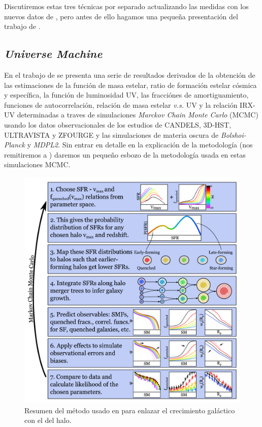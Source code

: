 Discutiremos estas tres técnicas por separado actualizando las medidas con los nuevos datos de \cite{behroozi2019universemachine}, pero antes de ello hagamos una pequeña presentación del trabajo de \cite{behroozi2019universemachine}.

\subsection{\textit{Universe Machine}}

En el trabajo de \cite{behroozi2019universemachine} se presenta una serie de resultados derivados de la obtención de las estimaciones de la función de masa estelar, ratio de formación estelar cósmica y específica, la función de luminosidad UV, las fracciónes de amortiguamiento, funciones de autocorrelación, relación de masa estelar \textit{v.s.} UV y la relación IRX-UV determinadas a traves de simulaciones \textit{Marckov Chain Monte Carlo} (MCMC) usando los datos observacionales de los estudios de CANDELS, 3D-HST, ULTRAVISTA y ZFOURGE y las simulaciones de materia oscura de \textit{Bolshoi-Planck} y \textit{MDPL2}. Sin entrar en detalle en la explicación de la metodología (nos remitiremos a \cite{behroozi2019universemachine}) daremos un pequeño esbozo de la metodología usada en estas simulaciones MCMC.\\

\begin{figure}
	\centering
	\includegraphics[scale=0.5]{Figures/behroozi_mcmc}
	\caption{\label{fig:behroozi_mcmc} Resumen del método usado en \cite{behroozi2019universemachine} para enlazar el crecimiento galáctico con el del halo.}
\end{figure}

